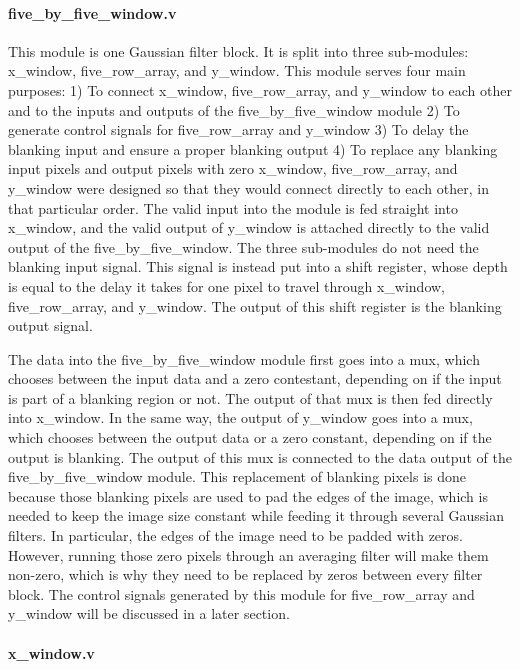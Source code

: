 \documentclass[12pt]{article}
\begin{document}
\paragraph{five\_by\_five\_window.v}

This module is one Gaussian filter block. It is split into three sub-modules: 
x\_window, five\_row\_array, and y\_window. This module serves four main purposes:
1) To connect x\_window, five\_row\_array, and y\_window to each other and to the 
   inputs and outputs of the five\_by\_five\_window module
2) To generate control signals for five\_row\_array and y\_window
3) To delay the blanking input and ensure a proper blanking output
4) To replace any blanking input pixels and output pixels with zero
x\_window, five\_row\_array, and y\_window were designed so that they would connect 
directly to each other, in that particular order. The valid input into the 
module is fed straight into x\_window, and the valid output of y\_window is 
attached directly to the valid output of the five\_by\_five\_window.
The three sub-modules do not need the blanking input signal. This signal is 
instead put into a shift register, whose depth is equal to the delay it takes 
for one pixel to travel through x\_window, five\_row\_array, and y\_window. The 
output of this shift register is the blanking output signal.

The data into the five\_by\_five\_window module first goes into a mux, which 
chooses between the input data and a zero contestant, depending on if the input 
is part of a blanking region or not. The output of that mux is then fed directly 
into x\_window. In the same way, the output of y\_window goes into a mux, which 
chooses between the output data or a zero constant, depending on if the output 
is blanking. The output of this mux is connected to the data output of the 
five\_by\_five\_window module. This replacement of blanking pixels is done because 
those blanking pixels are used to pad the edges of the image, which is needed to 
keep the image size constant while feeding it through several Gaussian filters. 
In particular, the edges of the image need to be padded with zeros. However, 
running those zero pixels through an averaging filter will make them non-zero, 
which is why they need to be replaced by zeros between every filter block.
The control signals generated by this module for five\_row\_array and y\_window 
will be discussed in a later section.

\paragraph{x\_window.v}
\end{document}
